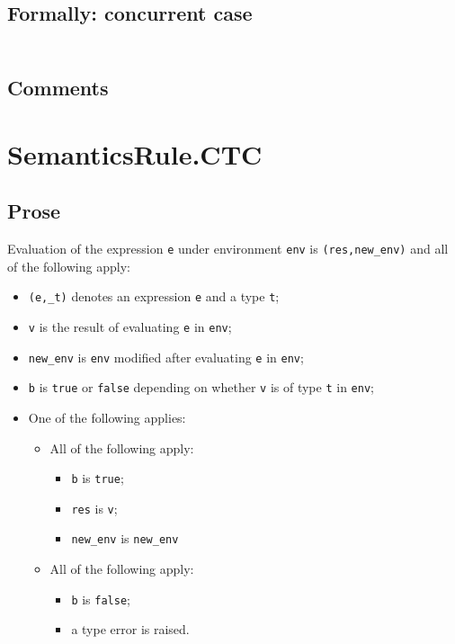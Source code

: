 \documentclass{book}
\begin{document}
  \subsection{Formally: concurrent case}
  \begin{align}
  \end{align} 

  \subsection{Comments}

\section{SemanticsRule.CTC \label{sec:SemanticsRule.CTC}}

  \subsection{Prose}
  Evaluation of the expression \texttt{e} under environment \texttt{env} is
  \texttt{(res,new\_env)} and all of the following apply:
  \begin{itemize}
  \item \texttt{(e,\_t)} denotes an expression \texttt{e} and a type \texttt{t};
  \item \texttt{v} is the result of evaluating \texttt{e} in \texttt{env};
  \item \texttt{new\_env} is \texttt{env} modified after evaluating \texttt{e} in \texttt{env};
  \item \texttt{b} is \texttt{true} or \texttt{false} depending on whether \texttt{v} is of type \texttt{t} in \texttt{env};
  \item One of the following applies:
        \begin{itemize}
        \item All of the following apply:
              \begin{itemize}
              \item \texttt{b} is \texttt{true};
              \item \texttt{res} is \texttt{v};
              \item \texttt{new\_env} is \texttt{new\_env}
              \end{itemize} 
        \item All of the following apply:
              \begin{itemize}
              \item \texttt{b} is \texttt{false};
              \item a type error is raised. 
              \end{itemize} 
        \end{itemize}   
  \end{itemize} 
\end{document}
